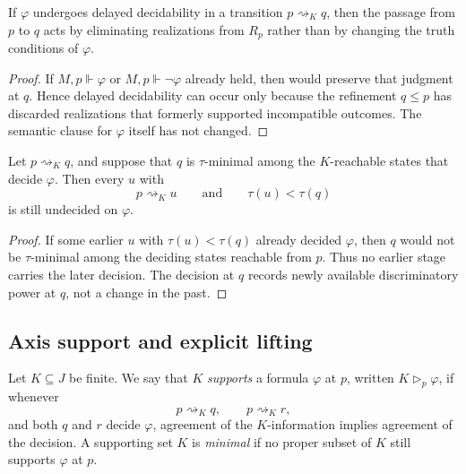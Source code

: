 \begin{proposition}\label{prop:delayed-no-new-truth}
If $\varphi$ undergoes delayed decidability in a transition $p\rightsquigarrow_K q$, then the passage from $p$ to $q$ acts by eliminating realizations from $R_p$ rather than by changing the truth conditions of $\varphi$.
\end{proposition}

\begin{proof}
If $M,p\Vdash\varphi$ or $M,p\Vdash\neg\varphi$ already held, then  would preserve that judgment at $q$. Hence delayed decidability can occur only because the refinement $q\le p$ has discarded realizations that formerly supported incompatible outcomes. The semantic clause for $\varphi$ itself has not changed.
\end{proof}

\begin{proposition}\label{prop:nonretrocausal-delayed-classification}
Let $p\rightsquigarrow_K q$, and suppose that $q$ is $\tau$-minimal among the $K$-reachable states that decide $\varphi$. Then every $u$ with
\[
p\rightsquigarrow_K u
\qquad\text{and}\qquad
\tau(u)<\tau(q)
\]
is still undecided on $\varphi$.
\end{proposition}

\begin{proof}
If some earlier $u$ with $\tau(u)<\tau(q)$ already decided $\varphi$, then $q$ would not be $\tau$-minimal among the deciding states reachable from $p$. Thus no earlier stage carries the later decision. The decision at $q$ records newly available discriminatory power at $q$, not a change in the past.
\end{proof}

\subsection{Axis support and explicit lifting}

\begin{definition}\label{def:axis-support}
Let $K\subseteq J$ be finite. We say that $K$ \emph{supports} a formula $\varphi$ at $p$, written $K\triangleright_p\varphi$, if whenever
\[
p\rightsquigarrow_K q,\qquad
p\rightsquigarrow_K r,
\]
and both $q$ and $r$ decide $\varphi$, agreement of the $K$-information implies agreement of the decision. A supporting set $K$ is \emph{minimal} if no proper subset of $K$ still supports $\varphi$ at $p$.
\end{definition}

